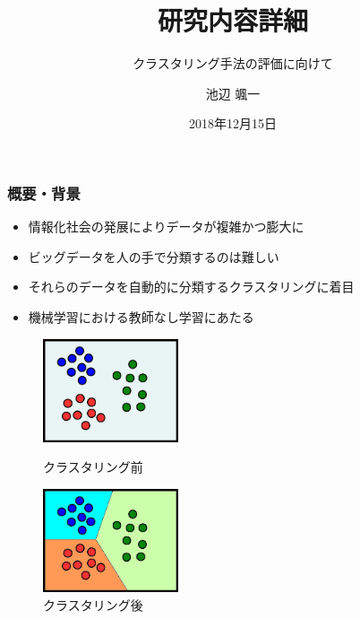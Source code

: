 \documentclass[13pt,dvipdfmx]{beamer}
\title{研究内容詳細}
\subtitle{クラスタリング手法の評価に向けて}
\author{池辺 颯一}
\institute{芝浦工業大学}
\date{2018年12月15日}
\begin{document}
\begin{frame}\frametitle{}
 \titlepage
\end{frame}

\begin{frame}\frametitle{概要・背景}
\begin{itemize}
 \item 情報化社会の発展によりデータが複雑かつ膨大に
 \item ビッグデータを人の手で分類するのは難しい
 \item それらのデータを自動的に分類するクラスタリングに着目
 \item 機械学習における教師なし学習にあたる
\end{itemize}
\vspace{5mm}
\begin{figure}[htbp]
 \begin{minipage}{0.4\hsize}
  \begin{center}
   \includegraphics[width=40mm]{before_clustering.png}
  \end{center}
  \captionsetup{labelformat=empty,labelsep=none}
  \caption{クラスタリング前}
  \label{fig:one}
 \end{minipage}
\hspace{1cm}
 \begin{minipage}{0.4\hsize}
  \begin{center}
   \includegraphics[width=40mm]{after_clustering.png}
  \end{center}
  \captionsetup{labelformat=empty,labelsep=none}
  \caption{クラスタリング後}
  \label{fig:two}
 \end{minipage}
\end{figure}
\end{frame}
\end{document}
